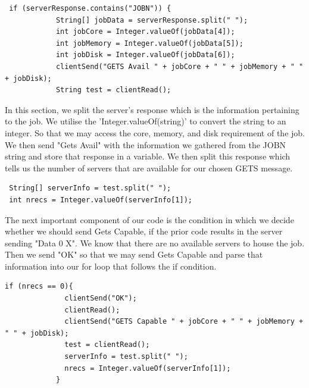 \documentclass[a4paper]{article} %
\begin{document}
\begin{verbatim}
 if (serverResponse.contains("JOBN")) {
            String[] jobData = serverResponse.split(" ");
            int jobCore = Integer.valueOf(jobData[4]);
            int jobMemory = Integer.valueOf(jobData[5]);
            int jobDisk = Integer.valueOf(jobData[6]);
            clientSend("GETS Avail " + jobCore + " " + jobMemory + " " + jobDisk);
            String test = clientRead();
\end{verbatim}

In this section, we split the server's response which is the information pertaining to the job. We utilise the 'Integer.valueOf(string)' to convert the string to an integer. So that we may access the core, memory, and disk requirement of the job. We then send "Gets Avail" with the information we gathered from the JOBN string and store that response in a variable. We then split this response which tells us the number of servers that are available for our chosen GETS message.

\begin{verbatim}
 String[] serverInfo = test.split(" ");
 int nrecs = Integer.valueOf(serverInfo[1]);
\end{verbatim}

The next important component of our code is the condition in which we decide whether we should send Gets Capable, if the prior code results in the server sending "Data 0 X". We know that there are no available servers to house the job. Then we send "OK" so that we may send Gets Capable and parse that information into our for loop that follows the if condition.
\begin{verbatim}
if (nrecs == 0){
              clientSend("OK");
              clientRead();
              clientSend("GETS Capable " + jobCore + " " + jobMemory + " " + jobDisk);
              test = clientRead();
              serverInfo = test.split(" ");
              nrecs = Integer.valueOf(serverInfo[1]);
            }
\end{verbatim}
\end{document}
